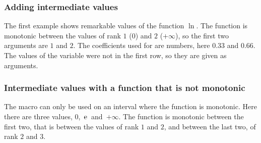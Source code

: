 \subsubsection{Adding intermediate values}

The first example shows remarkable values of the function $\ln$. The function is monotonic between the values of rank $1$ ($0$) and $2$ ($+\infty$), so the first two arguments are $1$ and $2$. The coefficients used for  are  numbers, here $0.33$ and $0.66$. The values of the variable were not in the first row, so they are given as arguments.

\begin{tkzexample}
\end{tkzexample}

\begin{tkzexample}
\end{tkzexample}

\subsubsection{Intermediate values with a function that is not monotonic}

The macro can only be used on an interval where the function is monotonic. Here there are three values,
\mbox{$0$, $\mathrm{e}$ and $+\infty$}. The function is monotonic between the first two, that is between the values of rank $1$ and $2$, and between the last two, of rank $2$ and $3$.

\begin{tkzexample}
\end{tkzexample}

